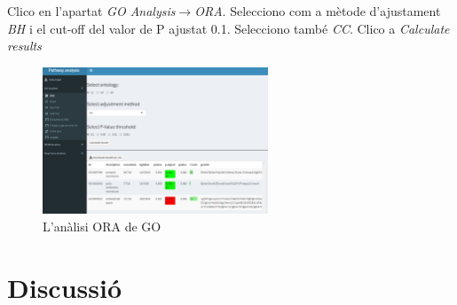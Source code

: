 Clico en l'apartat \textit{GO Analysis}$\rightarrow$\textit{ORA}. Selecciono com a mètode d'ajustament \textit{BH} i el cut-off del valor de P ajustat 0.1. Selecciono també \textit{CC}. Clico a \textit{Calculate results}
\begin{figure}[H]
\centering
\includegraphics[width=0.6\textwidth]{Estudi1_Fig13_GO.png} 
\caption{L'anàlisi ORA de GO}
\end{figure}

\section{Discussió}
